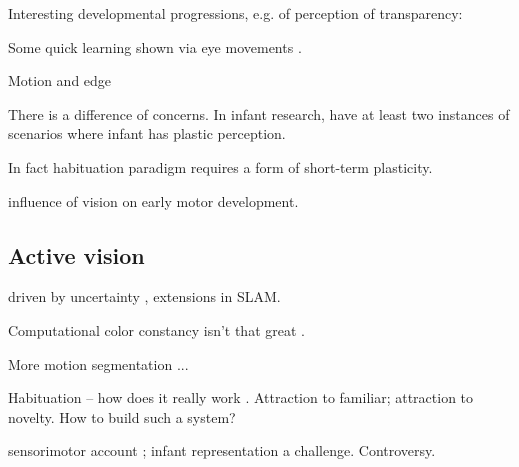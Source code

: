 Interesting developmental progressions, e.g. of perception
of transparency: \cite{johnson00infants}


Some quick learning shown via eye movements \cite{johnson03development}.

Motion and edge \cite{smith03motion}

There is a difference of concerns.  In infant research, have
at least two instances of scenarios where infant has
plastic perception.

In fact habituation paradigm requires a form of short-term
plasticity. 


\cite{prechtl01role} influence of vision on early motor 
development.

\subsection{Active vision}

\cite{bajcsy88active,aloimonos87active,ballard91animate}

driven by uncertainty \cite{whaite97autonomous}, 
extensions in SLAM.

Computational color constancy isn't that great
\cite{barnard02comparison}.

More motion segmentation \cite{smith04layered}...

Habituation -- how does it really work \cite{sirois02models}.
Attraction to familiar; attraction to novelty.
How to build such a system?

sensorimotor account \cite{oregan01sensorimotor};
infant representation a challenge.  Controversy.




\newpage

\ 

\newpage

